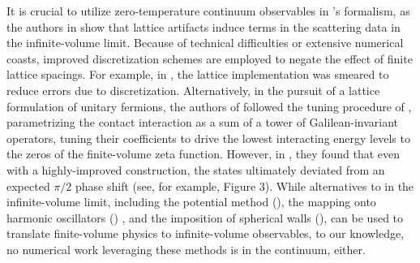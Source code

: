 {It is crucial to utilize zero-temperature continuum observables in \Luscher's formalism, as the authors in  show that lattice artifacts induce terms in the scattering data in the infinite-volume limit.
Because of technical difficulties or extensive numerical coasts, improved discretization schemes are employed to negate the effect of finite lattice spacings.
For example, in , the lattice implementation was smeared to reduce errors due to discretization.
Alternatively, in the pursuit of a lattice formulation of unitary fermions, the authors of  followed the tuning procedure of , parametrizing the contact interaction as a sum of a tower of Galilean-invariant operators, tuning their coefficients to drive the lowest interacting energy levels to the zeros of the \Luscher finite-volume zeta function.
However, in , they found that even with a highly-improved construction, the states ultimately deviated from an expected $\pi/2$ phase shift (see, for example, Figure 3).
While alternatives to in the infinite-volume limit, including the potential method (), the mapping onto harmonic oscillators () , and the imposition of spherical walls (), can be used to translate finite-volume physics to infinite-volume observables, to our knowledge, no numerical work leveraging these methods is in the continuum, either.

}
